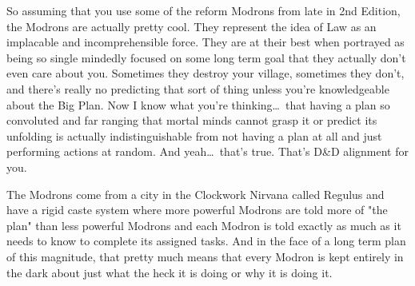 So assuming that you use some of the reform Modrons from late in 2nd Edition, the Modrons are actually pretty cool. They represent the idea of Law as an implacable and incomprehensible force. They are at their best when portrayed as being so single mindedly focused on some long term goal that they actually don't even care about you. Sometimes they destroy your village, sometimes they don't, and there's really no predicting that sort of thing unless you're knowledgeable about the Big Plan. Now I know what you're thinking\ldots\ that having a plan so convoluted and far ranging that mortal minds cannot grasp it or predict its unfolding is actually indistinguishable from not having a plan at all and just performing actions at random. And yeah\ldots\ that's true. That's D\&D alignment for you.

The Modrons come from a city in the Clockwork Nirvana called Regulus and have a rigid caste system where more powerful Modrons are told more of "the plan" than less powerful Modrons and each Modron is told exactly as much as it needs to know to complete its assigned tasks. And in the face of a long term plan of this magnitude, that pretty much means that every Modron is kept entirely in the dark about just what the heck it is doing or why it is doing it.
